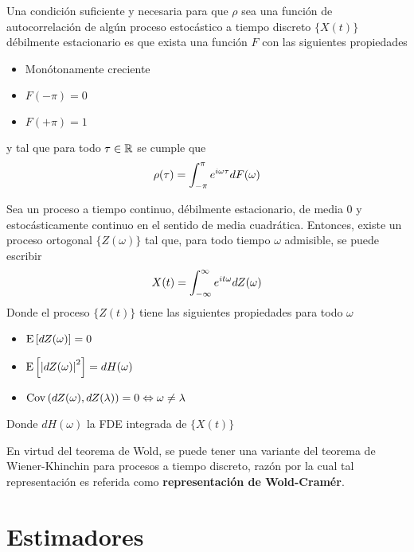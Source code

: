 \begin{teorema}[Wold]
Una condición suficiente y necesaria para que $\rho$ sea una función de autocorrelación de 
algún proceso estocástico a tiempo discreto $\{X(t)\}$ débilmente estacionario es que exista 
una función $F$ con las siguientes propiedades
\begin{itemize}
\item Monótonamente creciente
\item $F(-\pi) = 0$
\item $F(+\pi) = 1$
\end{itemize}
y tal que para todo $\tau \in \mathbb{R}$ se cumple que
\begin{equation*}
\rho(\tau) = \int_{-\pi}^{\pi} e^{i \omega \tau} dF(\omega)
\end{equation*}
\label{t_wold}
\end{teorema}

\begin{teorema}
Sea \xt un proceso a tiempo continuo, débilmente estacionario, de media 0 y estocásticamente 
continuo en el sentido de media cuadrática. Entonces, existe un proceso 
ortogonal $\{Z(\omega)\}$ tal que, para todo tiempo $\omega$ admisible, se puede 
escribir
\begin{equation*}
X(t) = \int_{-\infty}^{\infty} e^{i t \omega} dZ(\omega)
\end{equation*}
Donde el proceso $\{Z(t)\}$ tiene las siguientes propiedades para todo $\omega$
\begin{itemize}
\item $\mathrm{E}\left[ dZ(\omega) \right] = 0$
\item $\mathrm{E}\left[ \left| dZ(\omega) \right|^{2} \right] = dH(\omega)$
\item $\mathrm{Cov}\left( dZ(\omega),dZ(\lambda) \right) = 0 \Leftrightarrow \omega \neq \lambda$
\end{itemize}
Donde $dH(\omega)$ la FDE integrada de $\{X(t)\}$
\end{teorema}

En virtud del teorema de Wold, se puede tener una variante del teorema de Wiener-Khinchin
para procesos a tiempo discreto, razón por la cual  
tal representación es referida como \textbf{representación de Wold-Cramér}.


\section{Estimadores}

